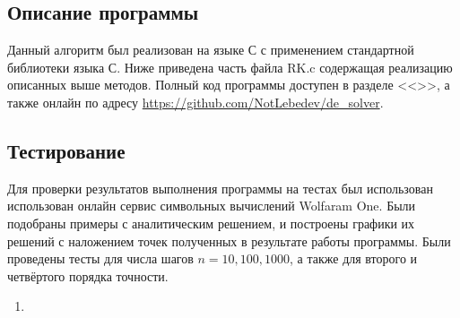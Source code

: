 \documentclass[a4paper,12pt,titlepage,finall]{article}
\begin{document}
\subsection{Описание программы}
Данный алгоритм был реализован на языке С с применением стандартной библиотеки языка С. Ниже приведена часть файла RK.c содержащая реализацию описанных выше методов. Полный код программы доступен в разделе <<>>, а также онлайн по адресу \url{https://github.com/NotLebedev/de_solver}.


\subsection{Тестирование}
Для проверки результатов выполнения программы на тестах был использован использован онлайн сервис символьных вычислений Wolfaram One. Были подобраны примеры с аналитическим решением, и построены графики их решений с наложением точек полученных в результате работы программы. Были проведены тесты для числа шагов $n = 10, 100, 1000$, а также для второго и четвёртого порядка точности.
\begin{enumerate}
\item

\end{enumerate}
\end{document}
